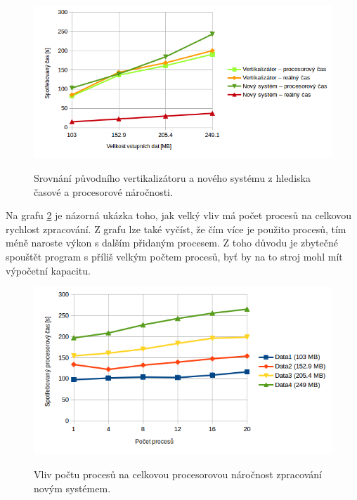 \begin{figure}[H]
    \begin{center}
        \label{graph:graph_vertikalizator_vs_ja}
        \includegraphics[width=1.0\textwidth]{obrazky-figures/graph_vertikalizator_vs_ja.png}
        \caption{Srovnání původního vertikalizátoru a nového systému z hlediska časové a procesorové náročnosti.}
    \end{center}
\end{figure}

Na grafu \ref{graph:graph_realny_cas_vertikalizace} je názorná ukázka toho, jak velký vliv má počet
procesů na celkovou rychlost zpracování. Z grafu lze také vyčíst, že čím více je použito procesů,
tím méně naroste výkon s dalším přidaným procesem. Z toho důvodu je zbytečné spouštět
program s příliš velkým počtem procesů, byť by na to stroj mohl mít výpočetní kapacitu.

\begin{figure}[H]
    \begin{center}
        \label{graph:graph_realny_cas_vertikalizace}
        \includegraphics[width=1.0\textwidth]{obrazky-figures/graph_procesorovy_cas_vertikalizace.png}
        \caption{Vliv počtu procesů na celkovou procesorovou náročnost zpracování novým systémem.}
    \end{center}
\end{figure}


